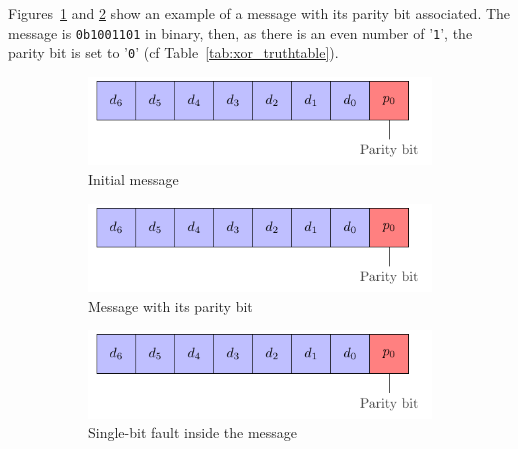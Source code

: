 Figures~\ref{fig:simpleparity_example_1} and \ref{fig:simpleparity_example_2} show an example of a message with its parity bit associated. The message is \texttt{0b1001101} in binary, then, as there is an even number of '\texttt{1}', the parity bit is set to '\texttt{0}' (cf Table~\ref{tab:xor_truthtable}).
\begin{figure}[ht]
    \centering
    \begin{subfigure}[b]{0.49\textwidth}
        \includegraphics[width=\textwidth, page=2]{c5_countermeasures_dift/img/simple_parity.pdf}
        \caption{Initial message}
        \label{fig:simpleparity_example_1}
    \end{subfigure}
    \hfill
    \begin{subfigure}[b]{0.49\textwidth}
        \includegraphics[width=\textwidth, page=3]{c5_countermeasures_dift/img/simple_parity.pdf}
        \caption{Message with its parity bit}
        \label{fig:simpleparity_example_2}
    \end{subfigure}
    \hfill
    \begin{subfigure}[b]{0.49\textwidth}
        \includegraphics[width=\textwidth, page=4]{c5_countermeasures_dift/img/simple_parity.pdf}
        \caption{Single-bit fault inside the message}
        \label{fig:simpleparity_faulted_example_3}
    \end{subfigure}
    \hfill
    \begin{subfigure}[b]{0.49\textwidth}

\end{subfigure}
\end{figure}
